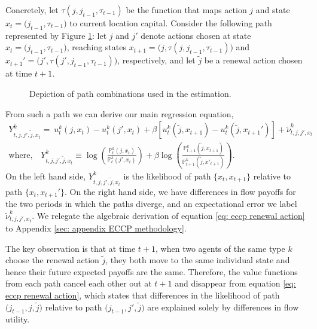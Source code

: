 \documentclass[11pt]{article}
\newcommand{\Prob}{\mathbb{P}}
\begin{document}
Concretely, let $\tau(j, j_{t-1},\tau_{t-1})$ be the function that maps action $j$ and state $x_{t}=\big(j_{t-1},\tau_{t-1}\big)$ to current location capital. Consider the following path represented by Figure \ref{fig: diag renewal}: let $j$ and $j'$ denote actions chosen at state $x_{t}=\big(j_{t-1},\tau_{t-1}\big)$, reaching states $x_{t+1} = \big( j,\tau(j,j_{t-1},\tau_{t-1}) \big)$ and $x_{t+1}'=\big( j',\tau(j',j_{t-1},\tau_{t-1}) \big) $, respectively, and let $\tilde{j}$ be a renewal action chosen at time $t+1$. 
\begin{figure}[htbp]
\caption{Depiction of path combinations used in the estimation.}
\centering
{}
\label{fig: diag renewal}
\end{figure}

\noindent From such a path we can derive our main regression equation,
\begin{align}\label{eq: eccp renewal action}
   Y^k_{t,j,j',\tilde{j},x_{t}}  = \  u^k_t\left(j,x_{t}\right) -u^k_t\left(j',x_{t}\right) + \beta \left[ u^k_t\left(\tilde{j},x_{t+1}\right)-u^k_t\left(\tilde{j},x_{t+1}'\right)\right] +\tilde{\nu}^k_{t,j,j',x_{t}} & \nonumber \\
    \text{where,} \quad  Y^k_{t,j,j',\tilde{j},x_{t}} \equiv \log \left( \frac{\Prob^k_t(j,x_{t})}{\Prob^k_t(j',x_{t})}\right)+\beta\log \left( \frac{\Prob^k_{t+1}\left(\tilde{j},x_{t+1}\right)}{\Prob^k_{t+1}\left(\tilde{j},x'_{t+1}\right)}\right). &
\end{align}
On the left hand side, $Y^k_{t,j,j',\tilde{j},x_{t}}$ is the likelihood of path $\{x_{t},x_{t+1}\}$ relative to path $\{x_{t},x_{t+1}'\}$. On the right hand side, we have differences in flow payoffs for the two periods in which the paths diverge, and an expectational error we label $\tilde{\nu}^k_{t,j,j',x_{t}}$. We relegate the algebraic derivation of equation \eqref{eq: eccp renewal action} to Appendix \ref{sec: appendix ECCP methodology}. 

The key observation is that at time $t+1$, when two agents of the same type $k$ choose the renewal action $\tilde{j}$, they both move to the same individual state and hence their future expected payoffs are the same. Therefore, the value functions from each path cancel each other out at $t+1$ and disappear from equation \eqref{eq: eccp renewal action}, which states that differences in the likelihood of path $\big(j_{t-1},j, \tilde{j})$ relative to path $\big(j_{t-1},j', \tilde{j})$ are explained solely by differences in flow utility.
\end{document}
